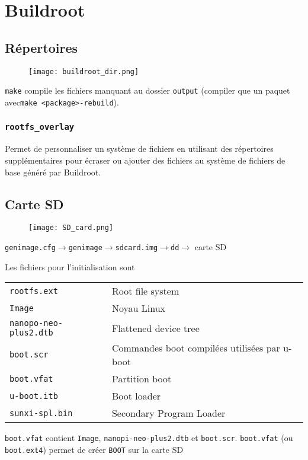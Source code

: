 \section{Buildroot}
\subsection{Répertoires}
\begin{figure}[H]
    \centering
    \texttt{[image: buildroot\_dir.png]}
\end{figure}
\verb+make+ compile les fichiers manquant au dossier \verb+output+ (compiler que un paquet avec\verb+make <package>-rebuild+).
%
\subsubsection{\texttt{rootfs\_overlay}}
Permet de personnaliser un système de fichiers en utilisant des répertoires supplémentaires pour écraser ou ajouter des fichiers au système de fichiers de base généré par Buildroot.
\subsection{Carte SD}
\begin{figure}[H]
    \centering
    \texttt{[image: SD\_card.png]}
\end{figure}
\begin{center}
\verb!genimage.cfg!$\rightarrow$\verb!genimage!$\rightarrow$\verb!sdcard.img!$\rightarrow$\verb!dd!$\rightarrow$ carte SD
\end{center}
Les fichiers pour l'initialisation sont\\
\begin{table}[H]
\begin{tabular}{lp{4cm}}
\verb!rootfs.ext! & Root file system\\
\verb!Image! & Noyau Linux\\
\verb!nanopo-neo-plus2.dtb! & Flattened device tree\\
\verb!boot.scr! & Commandes boot compilées utilisées par u-boot\\
\verb!boot.vfat! & Partition boot\\
\verb!u-boot.itb! & Boot loader\\
\verb!sunxi-spl.bin! & Secondary Program Loader
\end{tabular}
\end{table}
\verb!boot.vfat! contient \verb!Image!, \verb!nanopi-neo-plus2.dtb! et \verb!boot.scr!. \verb!boot.vfat! (ou \verb!boot.ext4!) permet de créer \verb!BOOT! sur la carte SD
